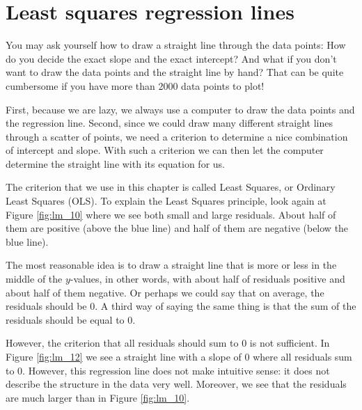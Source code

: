 \documentclass[]{report}\usepackage[]{graphicx}\usepackage[]{color}
\begin{document}
\section{Least squares regression lines}


You may ask yourself how to draw a straight line through the data points: How do you decide the exact slope and the exact intercept? And what if you don't want to draw the data points and the straight line by hand? That can be quite cumbersome if you have more than 2000 data points to plot!

First, because we are lazy, we always use a computer to draw the data points and the regression line. Second, since we could draw many different straight lines through a scatter of points, we need a criterion to determine a nice combination of intercept and slope. With such a criterion we can then let the computer determine the straight line with its equation for us.

The criterion that we use in this chapter is called Least Squares, or Ordinary Least Squares (OLS). To explain the Least Squares principle, look again at Figure \ref{fig:lm_10} where we see both small and large residuals. About half of them are positive (above the blue line) and half of them are negative (below the blue line).

The most reasonable idea is to draw a straight line that is more or less in the middle of the $y$-values, in other words, with about half of residuals positive and about half of them negative. Or perhaps we could say that on average, the residuals should be 0. A third way of saying the same thing is that the sum of the residuals should be equal to 0.

However, the criterion that all residuals should sum to 0 is not sufficient. In Figure \ref{fig:lm_12} we see a straight line with a slope of 0 where all residuals sum to 0. However, this regression line does not make intuitive sense: it does not describe the structure in the data very well. Moreover, we see that the residuals are much larger than in Figure \ref{fig:lm_10}.
\end{document}

